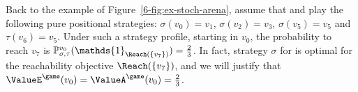 Back to the example of Figure~\ref{6-fig:ex-stoch-arena}, assume that
\Eve and \Adam play the following pure positional strategies:
$\sigma(v_0) = v_1$, $\sigma(v_2) = v_3$, $\sigma(v_5) = v_5$ and
$\tau(v_6) = v_5$. Under such a strategy profile, starting in $v_0$,
the probability to reach $v_7$ is
$\probm_{\sigma,\tau}^{v_0}(\mathds{1}_{\Reach(\{v_7\})}) = \frac 2
3$. In fact, strategy $\sigma$ for \Eve is optimal for the
reachability objective $\Reach(\{v_7\})$, and we will justify that
$\ValueE^\game(v_0) = \ValueA^\game(v_0) = \frac 2 3$.

